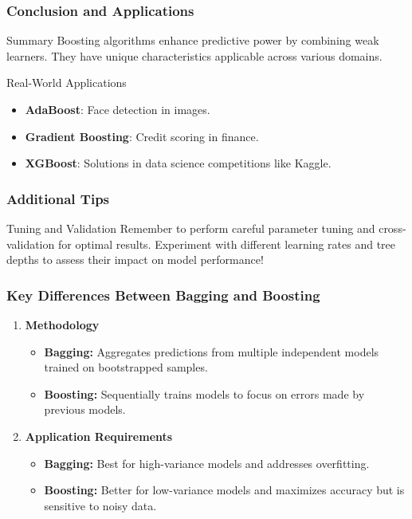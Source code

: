 \documentclass[aspectratio=169]{beamer}
\begin{document}
\begin{frame}[fragile]
    \frametitle{Conclusion and Applications}
    \begin{block}{Summary}
        Boosting algorithms enhance predictive power by combining weak learners. They have unique characteristics applicable across various domains.
    \end{block}
    \begin{block}{Real-World Applications}
        \begin{itemize}
            \item \textbf{AdaBoost}: Face detection in images.
            \item \textbf{Gradient Boosting}: Credit scoring in finance.
            \item \textbf{XGBoost}: Solutions in data science competitions like Kaggle.
        \end{itemize}
    \end{block}
\end{frame}

\begin{frame}[fragile]
    \frametitle{Additional Tips}
    \begin{block}{Tuning and Validation}
        Remember to perform careful parameter tuning and cross-validation for optimal results. Experiment with different learning rates and tree depths to assess their impact on model performance!
    \end{block}
\end{frame}

\begin{frame}[fragile]
    \frametitle{Key Differences Between Bagging and Boosting}
    \begin{enumerate}
        \item \textbf{Methodology}
        \begin{itemize}
            \item \textbf{Bagging:} Aggregates predictions from multiple independent models trained on bootstrapped samples.
            \item \textbf{Boosting:} Sequentially trains models to focus on errors made by previous models.
        \end{itemize}
        
        \item \textbf{Application Requirements}
        \begin{itemize}
            \item \textbf{Bagging:} Best for high-variance models and addresses overfitting.
            \item \textbf{Boosting:} Better for low-variance models and maximizes accuracy but is sensitive to noisy data.
        \end{itemize}
    \end{enumerate}
\end{frame}
\end{document}
